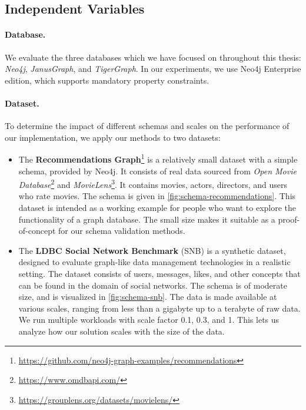 \documentclass{report}
\theoremstyle{definition}
\begin{document}
\subsection{Independent Variables}

\paragraph{Database.} We evaluate the three databases which we have focused on throughout this thesis: \emph{Neo4j}, \emph{JanusGraph}, and \emph{TigerGraph}. In our experiments, we use Neo4j Enterprise edition, which supports mandatory property constraints.

\paragraph{Dataset.} To determine the impact of different schemas and scales on the performance of our implementation, we apply our methods to two datasets:

\begin{itemize}
  \item The \textbf{Recommendations Graph}\footnote{\url{https://github.com/neo4j-graph-examples/recommendations}} is a relatively small dataset with a simple schema, provided by Neo4j. It consists of real data sourced from \emph{Open Movie Database}\footnote{\url{https://www.omdbapi.com/}} and \emph{MovieLens}\footnote{\url{https://grouplens.org/datasets/movielens/}}. It contains movies, actors, directors, and users who rate movies. The schema is given in \autoref{fig:schema-recommendations}. This dataset is intended as a working example for people who want to explore the functionality of a graph database. The small size makes it suitable as a proof-of-concept for our schema validation methods.
  \item The \textbf{LDBC Social Network Benchmark} (SNB) \citep{angles2020snb} is a synthetic dataset, designed to evaluate graph-like data management technologies in a realistic setting. The dataset consists of users, messages, likes, and other concepts that can be found in the domain of social networks. The schema is of moderate size, and is visualized in \autoref{fig:schema-snb}. The data is made available at various scales, ranging from less than a gigabyte up to a terabyte of raw data. We run multiple workloads with scale factor 0.1, 0.3, and 1. This lets us analyze how our solution scales with the size of the data.
\end{itemize}
\end{document}
